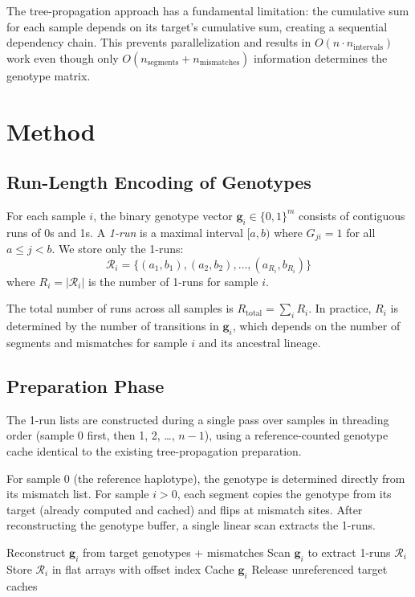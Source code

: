 \documentclass[11pt]{article}
\begin{document}
The tree-propagation approach has a fundamental limitation: the cumulative
sum for each sample depends on its target's cumulative sum, creating a
sequential dependency chain.  This prevents parallelization and results in
$O(n \cdot n_\text{intervals})$ work even though only $O(n_\text{segments}
+ n_\text{mismatches})$ information determines the genotype matrix.

\section{Method}

\subsection{Run-Length Encoding of Genotypes}

For each sample $i$, the binary genotype vector $\mathbf{g}_i \in
\{0,1\}^m$ consists of contiguous runs of 0s and 1s.  A \emph{1-run} is a
maximal interval $[a, b)$ where $G_{ji} = 1$ for all $a \le j < b$.  We
store only the 1-runs:
\[
\mathcal{R}_i = \{(a_1, b_1), (a_2, b_2), \ldots, (a_{R_i}, b_{R_i})\}
\]
where $R_i = |\mathcal{R}_i|$ is the number of 1-runs for sample $i$.

The total number of runs across all samples is
$R_\text{total} = \sum_i R_i$.  In practice, $R_i$ is determined by the
number of transitions in $\mathbf{g}_i$, which depends on the number of
segments and mismatches for sample $i$ and its ancestral lineage.

\subsection{Preparation Phase}

The 1-run lists are constructed during a single pass over samples in
threading order (sample 0 first, then 1, 2, \ldots, $n{-}1$), using a
reference-counted genotype cache identical to the existing tree-propagation
preparation.

For sample 0 (the reference haplotype), the genotype is determined directly
from its mismatch list.  For sample $i > 0$, each segment copies the
genotype from its target (already computed and cached) and flips at mismatch
sites.  After reconstructing the genotype buffer, a single linear scan
extracts the 1-runs.

\begin{algorithm}[h]
\caption{RLE Preparation}
\begin{algorithmic}[1]
    \State Reconstruct $\mathbf{g}_i$ from target genotypes + mismatches
    \State Scan $\mathbf{g}_i$ to extract 1-runs $\mathcal{R}_i$
    \State Store $\mathcal{R}_i$ in flat arrays with offset index
        \State Cache $\mathbf{g}_i$
    \EndIf
    \State Release unreferenced target caches
\EndFor
\end{algorithmic}
\end{algorithm}
\end{document}
